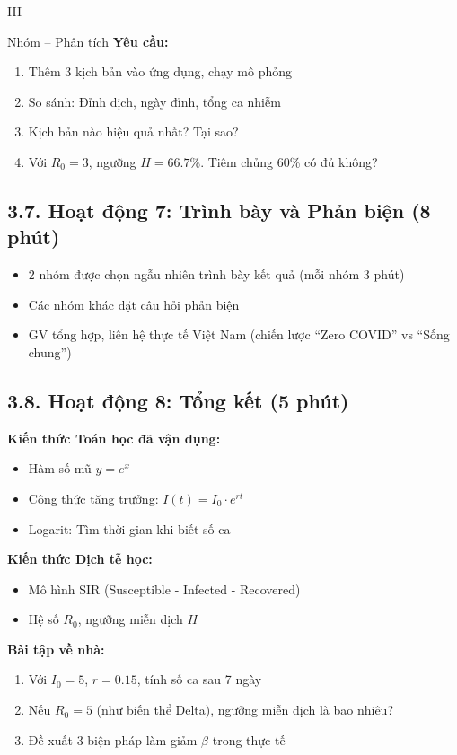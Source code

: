 \documentclass[12pt,a4paper]{article}
\begin{document}
\begin{competitionsection}{III}
\begin{taskbox}{Nhóm -- Phân tích}
\textbf{Yêu cầu:}
\begin{enumerate}
\item Thêm 3 kịch bản vào ứng dụng, chạy mô phỏng
\item So sánh: Đỉnh dịch, ngày đỉnh, tổng ca nhiễm
\item Kịch bản nào hiệu quả nhất? Tại sao?
\item Với $R_0 = 3$, ngưỡng $H = 66.7\%$. Tiêm chủng 60\% có đủ không?
\end{enumerate}
\end{taskbox}

\subsection*{3.7. Hoạt động 7: Trình bày và Phản biện (8 phút)}

\begin{itemize}
\item 2 nhóm được chọn ngẫu nhiên trình bày kết quả (mỗi nhóm 3 phút)
\item Các nhóm khác đặt câu hỏi phản biện
\item GV tổng hợp, liên hệ thực tế Việt Nam (chiến lược ``Zero COVID'' vs ``Sống chung'')
\end{itemize}

\subsection*{3.8. Hoạt động 8: Tổng kết (5 phút)}

\begin{highlightbox}
\textbf{Kiến thức Toán học đã vận dụng:}
\begin{itemize}
\item Hàm số mũ $y = e^x$
\item Công thức tăng trưởng: $I(t) = I_0 \cdot e^{rt}$
\item Logarit: Tìm thời gian khi biết số ca
\end{itemize}

\textbf{Kiến thức Dịch tễ học:}
\begin{itemize}
\item Mô hình SIR (Susceptible - Infected - Recovered)
\item Hệ số $R_0$, ngưỡng miễn dịch $H$
\end{itemize}

\textbf{Bài tập về nhà:}
\begin{enumerate}
\item Với $I_0 = 5$, $r = 0.15$, tính số ca sau 7 ngày
\item Nếu $R_0 = 5$ (như biến thể Delta), ngưỡng miễn dịch là bao nhiêu?
\item Đề xuất 3 biện pháp làm giảm $\beta$ trong thực tế
\end{enumerate}
\end{highlightbox}

\end{competitionsection}
\newpage
\end{document}
